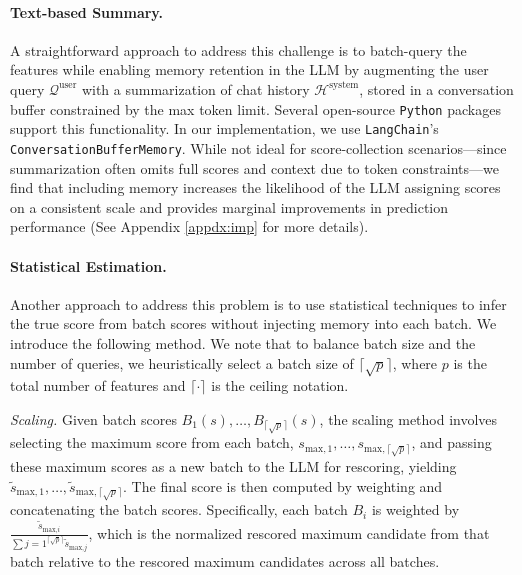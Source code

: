 \paragraph{Text-based Summary.} A straightforward approach to address this challenge is to batch-query the features while enabling memory retention in the LLM by augmenting the user query $\mathcal{Q}^{\text{user}}$ with a summarization of chat history $\mathcal{H}^{\text{system}}$, stored in a conversation buffer constrained by the max token limit. Several open-source \texttt{Python} packages support this functionality. In our implementation, we use \texttt{LangChain}'s \texttt{ConversationBufferMemory}. While not ideal for score-collection scenarios—since summarization often omits full scores and context due to token constraints—we find that including memory increases the likelihood of the LLM assigning scores on a consistent scale and provides marginal improvements in prediction performance (See Appendix \ref{appdx:imp} for more details). 

\paragraph{Statistical Estimation.} Another approach to address this problem is to use statistical techniques to infer the true score from batch scores without injecting memory into each batch. We introduce the following method. We note that to balance batch size and the number of queries, we heuristically select a batch size of $\lceil \sqrt{p} \rceil$, where $p$ is the total number of features and $\lceil \cdot\rceil$ is the ceiling notation.

\textit{Scaling.} Given batch scores $B_1(s), \dots, B_{\lceil \sqrt{p} \rceil}(s)$, the scaling method involves selecting the maximum score from each batch, $s_{\text{max},1}, \dots, s_{\text{max},\lceil \sqrt{p} \rceil}$, and passing these maximum scores as a new batch to the LLM for rescoring, yielding $\tilde{s}_{\text{max},1}, \dots, \tilde{s}_{\text{max},\lceil \sqrt{p} \rceil}$. The final score is then computed by weighting and concatenating the batch scores. Specifically, each batch $B_i$ is weighted by $\frac{\tilde{s}_{\text{max,}i}}{\sum{j=1}^{\lceil \sqrt{p} \rceil} \tilde{s}_{\text{max,}j}}$, which is the normalized rescored maximum candidate from that batch relative to the rescored maximum candidates across all batches. 

